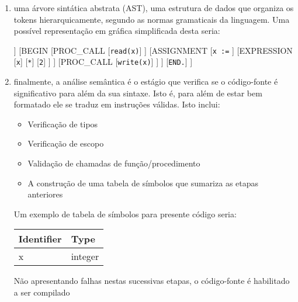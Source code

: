 {\begin{enumerate}
		\item uma árvore sintática abstrata (AST), uma estrutura de dados
		      que organiza os tokens hierarquicamente, segundo as normas
		      gramaticais da linguagem. Uma possível representação em gráfica
		      simplificada desta seria:

		      \begin{forest}
			      [PROGRAM
					      [\texttt{program p1;}]
					      [VAR\_DECL
						      [\texttt{x: integer;}]
					      ]
					      [BEGIN
							      [PROC\_CALL
								      [\texttt{read(x)}]
							      ]
							      [ASSIGNMENT
									      [\texttt{x :=}
									      ]
									      [EXPRESSION
											      [\texttt{x}]
											      [\texttt{*}]
											      [\texttt{2}]
									      ]
							      ]
							      [PROC\_CALL
								      [\texttt{write(x)}]
							      ]
					      ]
					      [\texttt{END.}]
			      ]
		      \end{forest}

		\item finalmente, a análise semântica é o estágio que verifica se o
		      código-fonte é significativo para além da sua sintaxe. Isto é,
		      para além de estar bem formatado ele se traduz em instruções
		      válidas. Isto inclui:

		      \begin{itemize}
			      \item Verificação de tipos
			      \item Verificação de escopo
			      \item Validação de chamadas de função/procedimento
			      \item A construção de uma tabela de símbolos que sumariza as
			            etapas anteriores
		      \end{itemize}

		      Um exemplo de tabela de símbolos para presente código seria:

		      \begin{tabularx}{\linewidth}{|l|X|}
			      \hline
			      \textbf{Identifier} & \textbf{Type} \\
			      \hline
			      x                   & integer       \\
			      \hline
		      \end{tabularx}

		      Não apresentando falhas nestas sucessivas etapas, o código-fonte é
		      habilitado a ser compilado


	\end{enumerate}
}

